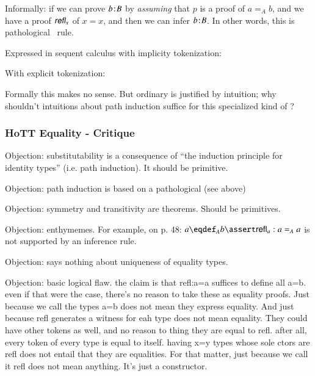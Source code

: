 Informally: if we can prove \(\tj{b}{B}\) by \textit{assuming} that
\(p\) is a proof of \(a=_Ab\), and we have a proof \(\refl_x\) of
\(x=x\), and then we can infer \(\tj{b}{B}\). In other words, this is
pathological \modus\ rule.

Expressed in sequent calculus with implicity tokenization:

\begin{prooftree}
\end{prooftree}

With explicit tokenization:

\begin{prooftree}
\end{prooftree}

Formally this makes no sense. But ordinary \modus{} is justified by
intuition; why shouldn't intuitions about path induction suffice for
this specialized kind of \modus?

\subsubsection{HoTT Equality - Critique}

Objection: substitutability is a consequence of ``the induction principle for identity types'' (i.e. path induction).  It should be primitive.

Objection: path induction is based on a pathological \modus (see above)

Objection: symmetry and transitivity are theorems. Should be primitives.

Objection: enthymemes. For example, on p. 48: \(a\defeq_A
b\linfer\textsf{refl}_a:a=_A a\) is not supported by an inference rule.

Objection: says nothing about uniqueness of equality types.

Objection: basic logical flaw. the claim is that refl:a=a suffices to
define all a=b. even if that were the case, there's no reason to take
these as equality proofs. Just because we call the types a=b does not
mean they express equality. And just because refl generates a witness
for eah type does not mean equality. They could have other tokens as
well, and no reason to thing they are equal to refl. after all, every
token of every type is equal to itself. having x=y types whose sole
ctors are refl does not entail that they are equalities. For that
matter, just because we call it refl does not mean anything. It's just
a constructor.

